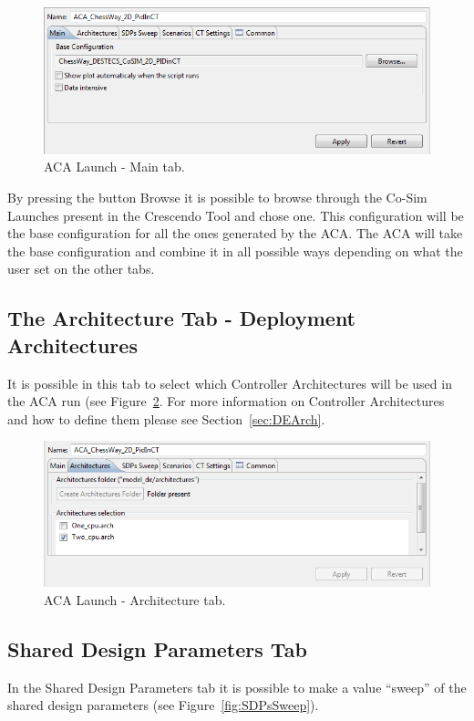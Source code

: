 \documentclass{crescendorepchap}
\begin{document}
\begin{figure}[htbp]
\centering
\includegraphics[width=.6\textwidth]{images/Destecsacamaintab.png}
\caption{ACA Launch - Main tab.\label{fig:Destecsacamaintab}}
\end{figure}

By pressing the button Browse it is
possible to browse through the Co-Sim Launches present in the Crescendo
Tool and chose one. This configuration will be the base configuration
for all the ones generated by the ACA. The ACA will take the base
configuration and combine it in all possible ways depending on what the
user set on the other tabs.

\subsection{The Architecture Tab - Deployment Architectures}

It is possible in this tab to select which Controller Architectures will
be used in the ACA run (see Figure~\ref{fig:ArchitecturesACA}. For more information on Controller Architectures
and how to define them please see Section~\ref{sec:DEArch}.

\begin{figure}[htbp]
\centering
\includegraphics[width=.6\textwidth]{images/ArchitecturesACA.png}
\caption{ACA Launch - Architecture tab.\label{fig:ArchitecturesACA}}
\end{figure}

\subsection{Shared Design Parameters Tab}

In the Shared Design Parameters tab it is possible to make a value
``sweep'' of the shared design parameters (see Figure~\ref{fig:SDPsSweep}).
\end{document}
